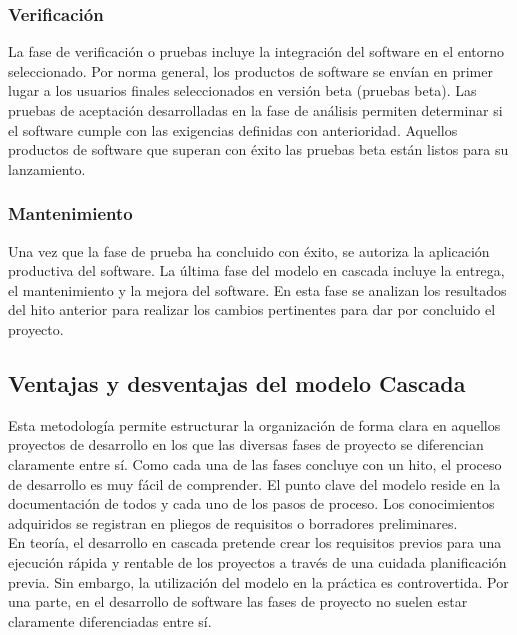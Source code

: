 \subsubsection{Verificación}
La fase de verificación o pruebas incluye la integración del software en el entorno seleccionado. Por norma general, los productos de software se envían en primer lugar a los usuarios finales seleccionados en versión beta (pruebas beta). Las pruebas de aceptación desarrolladas en la fase de análisis permiten determinar si el software cumple con las exigencias definidas con anterioridad. Aquellos productos de software que superan con éxito las pruebas beta están listos para su lanzamiento.\\

\subsubsection{Mantenimiento}

Una vez que la fase de prueba ha concluido con éxito, se autoriza la aplicación productiva del software. La última fase del modelo en cascada incluye la entrega, el mantenimiento y la mejora del software. En esta fase se analizan los resultados del hito anterior para realizar los cambios pertinentes para dar por concluido el proyecto.\\

\subsection{Ventajas y desventajas del modelo Cascada}
Esta metodología permite estructurar la organización de forma clara en aquellos proyectos de desarrollo en los que las diversas fases de proyecto se diferencian claramente entre sí. Como cada una de las fases concluye con un hito, el proceso de desarrollo es muy fácil de comprender. El punto clave del modelo reside en la documentación de todos y cada uno de los pasos de proceso. Los conocimientos adquiridos se registran en pliegos de requisitos o borradores preliminares.\\

En teoría, el desarrollo en cascada pretende crear los requisitos previos para una ejecución rápida y rentable de los proyectos a través de una cuidada planificación previa. Sin embargo, la utilización del modelo en la práctica es controvertida. Por una parte, en el desarrollo de software las fases de proyecto no suelen estar claramente diferenciadas entre sí.\\

